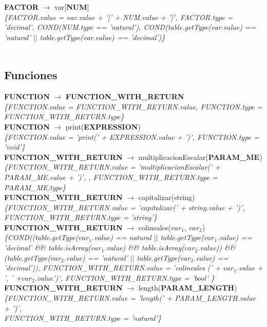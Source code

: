\documentclass[10pt,a4paper]{article}
\begin{document}
\textbf{FACTOR} $\rightarrow$ var[\textbf{NUM}]  \\ 
\textit{\{FACTOR.value = var.value + '[' + NUM.value + ']', FACTOR.type = 'decimal', COND(NUM.type == 'natural'), COND(table.getType(var.value) == 'natural' $||$ table.getType(var.value) == 'decimal')\}}  \\ 
\\




\subsection{Funciones}
\textbf{FUNCTION} $\rightarrow$ \textbf{FUNCTION\_WITH\_RETURN} \\
\textit{\{FUNCTION.value =  FUNCTION\_WITH\_RETURN.value, FUNCTION.type = FUNCTION\_WITH\_RETURN.type\}} \\

\textbf{FUNCTION} $\rightarrow$ print(\textbf{EXPRESSION}) \\   
\textit{\{FUNCTION.value =  'print(' + EXPRESSION.value + ')', FUNCTION.type = 'void'\}} \\

\textbf{FUNCTION\_WITH\_RETURN} $\rightarrow$ multiplicacionEscalar(\textbf{PARAM\_ME}) \\ 
\textit{\{FUNCTION\_WITH\_RETURN.value =  'multiplicacionEscalar(' + PARAM\_ME.value + ')', , FUNCTION\_WITH\_RETURN.type = PARAM\_ME.type\}} \\

\textbf{FUNCTION\_WITH\_RETURN} $\rightarrow$ capitalizar(string)   \\
\textit{\{FUNCTION\_WITH\_RETURN.value =  'capitalizar(' + string.value + ')', FUNCTION\_WITH\_RETURN.type = 'string'\}} \\

\textbf{FUNCTION\_WITH\_RETURN} $\rightarrow$ colineales($var_{1}$, $var_{2}$)   \\
\textit{\{COND((table.getType($var_{1}$.value) == natural $||$ table.getType($var_{1}$.value) == 'decimal' \&\& table.isArray($var_{1}$.value) \&\& table.isArray($var_{2}$.value)) \&\&
(table.getType($var_{2}$.value) == 'natural' $||$ table.getType($var_{2}$.value) == 'decimal')), FUNCTION\_WITH\_RETURN.value = 'colineales (' + $var_{1}$.value + ', ' +$var_{2}$.value')', FUNCTION\_WITH\_RETURN.type = 'bool' \}} \\

\textbf{FUNCTION\_WITH\_RETURN} $\rightarrow$ length(\textbf{PARAM\_LENGTH}) \\
\textit{\{FUNCTION\_WITH\_RETURN.value =  'length(' + PARAM\_LENGTH.value + ')',\\ 
FUNCTION\_WITH\_RETURN.type = 'natural'\}} \\
\end{document}
